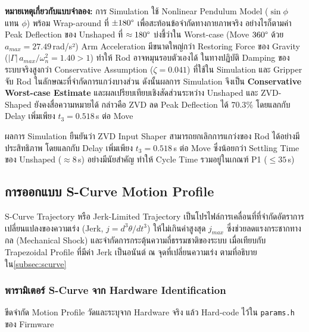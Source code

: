\textbf{หมายเหตุเกี่ยวกับแบบจำลอง:}
การ Simulation ใช้ Nonlinear Pendulum Model
($\sin\phi$ แทน $\phi$) พร้อม Wrap-around
ที่ $\pm 180\degree$ เพื่อสะท้อนข้อจำกัดทางกายภาพจริง
อย่างไรก็ตามค่า Peak Deflection ของ Unshaped
ที่ $\approx 180\degree$ บ่งชี้ว่าใน Worst-case
(Move $360\degree$ ด้วย $a_{max} = 27.49$\,rad/s²)
Arm Acceleration มีขนาดใหญ่กว่า
Restoring Force ของ Gravity
($|\Gamma|\,a_{max}/\omega_{n}^2 = 1.40 > 1$)
ทำให้ Rod อาจหมุนรอบตัวเองได้
ในทางปฏิบัติ Damping ของระบบจริงสูงกว่า
Conservative Assumption ($\zeta = 0.041$) ที่ใช้ใน Simulation
และ Gripper จับ Rod ในลักษณะที่จำกัดการแกว่งบางส่วน
ดังนั้นผลการ Simulation จึงเป็น
\textbf{Conservative Worst-case Estimate}
และผลเปรียบเทียบเชิงสัดส่วนระหว่าง
Unshaped และ ZVD-Shaped ยังคงสื่อความหมายได้
กล่าวคือ ZVD ลด Peak Deflection ได้ $70.3\%$
โดยแลกกับ Delay เพิ่มเพียง $t_3 = 0.518$\,s ต่อ Move

ผลการ Simulation ยืนยันว่า ZVD Input Shaper
สามารถยกเลิกการแกว่งของ Rod ได้อย่างมีประสิทธิภาพ
โดยแลกกับ Delay เพิ่มเพียง $t_3 = 0.518$\,s ต่อ Move
ซึ่งน้อยกว่า Settling Time ของ Unshaped
($\approx 8$\,s) อย่างมีนัยสำคัญ
ทำให้ Cycle Time รวมอยู่ในเกณฑ์ P1 ($\leq 35$\,s)

\subsection{การออกแบบ S-Curve Motion Profile}
\label{subsec:scurve_design}

S-Curve Trajectory หรือ Jerk-Limited Trajectory
เป็นโปรไฟล์การเคลื่อนที่ที่จำกัดอัตราการเปลี่ยนแปลงของความเร่ง
(Jerk, $j = d^3\theta/dt^3$) ให้ไม่เกินค่าสูงสุด $j_{max}$
ซึ่งช่วยลดแรงกระชากทางกล (Mechanical Shock)
และจำกัดการกระตุ้นความถี่ธรรมชาติของระบบ
เมื่อเทียบกับ Trapezoidal Profile ที่มีค่า Jerk เป็นอนันต์
ณ จุดที่เปลี่ยนความเร่ง
ตามที่อธิบายใน\cref{subsec:scurve}

\subsubsection{พารามิเตอร์ S-Curve จาก Hardware Identification}
\label{subsubsec:scurve_params}

ขีดจำกัด Motion Profile วัดและระบุจาก Hardware จริง
แล้ว Hard-code ไว้ใน \texttt{params.h} ของ Firmware

